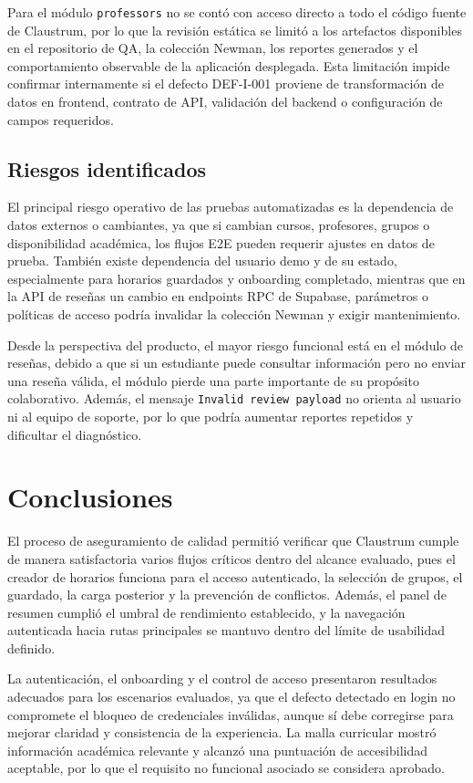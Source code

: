 \documentclass[11pt,spanish]{article}
\begin{document}
Para el módulo \texttt{professors} no se contó con acceso directo a todo el código fuente de Claustrum, por lo que la revisión estática se limitó a los artefactos disponibles en el repositorio de QA, la colección Newman, los reportes generados y el comportamiento observable de la aplicación desplegada. Esta limitación impide confirmar internamente si el defecto DEF-I-001 proviene de transformación de datos en frontend, contrato de API, validación del backend o configuración de campos requeridos.

\subsection{Riesgos identificados}

El principal riesgo operativo de las pruebas automatizadas es la dependencia de datos externos o cambiantes, ya que si cambian cursos, profesores, grupos o disponibilidad académica, los flujos E2E pueden requerir ajustes en datos de prueba. También existe dependencia del usuario demo y de su estado, especialmente para horarios guardados y onboarding completado, mientras que en la API de reseñas un cambio en endpoints RPC de Supabase, parámetros o políticas de acceso podría invalidar la colección Newman y exigir mantenimiento.

Desde la perspectiva del producto, el mayor riesgo funcional está en el módulo de reseñas, debido a que si un estudiante puede consultar información pero no enviar una reseña válida, el módulo pierde una parte importante de su propósito colaborativo. Además, el mensaje \texttt{Invalid review payload} no orienta al usuario ni al equipo de soporte, por lo que podría aumentar reportes repetidos y dificultar el diagnóstico.

\section{Conclusiones}

El proceso de aseguramiento de calidad permitió verificar que Claustrum cumple de manera satisfactoria varios flujos críticos dentro del alcance evaluado, pues el creador de horarios funciona para el acceso autenticado, la selección de grupos, el guardado, la carga posterior y la prevención de conflictos. Además, el panel de resumen cumplió el umbral de rendimiento establecido, y la navegación autenticada hacia rutas principales se mantuvo dentro del límite de usabilidad definido.

La autenticación, el onboarding y el control de acceso presentaron resultados adecuados para los escenarios evaluados, ya que el defecto detectado en login no compromete el bloqueo de credenciales inválidas, aunque sí debe corregirse para mejorar claridad y consistencia de la experiencia. La malla curricular mostró información académica relevante y alcanzó una puntuación de accesibilidad aceptable, por lo que el requisito no funcional asociado se considera aprobado.
\end{document}
